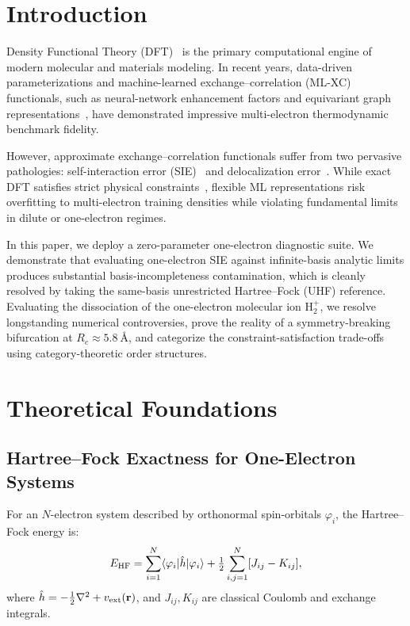\documentclass[conference]{IEEEtran}
\begin{document}
\section{Introduction}
Density Functional Theory (DFT)~\cite{HK1964,KS1965} is the primary computational engine of modern molecular and materials modeling. In recent years, data-driven parameterizations and machine-learned exchange--correlation (ML-XC) functionals, such as neural-network enhancement factors and equivariant graph representations~\cite{CIDER2022,CIDER2026,Skala2025,e3nn}, have demonstrated impressive multi-electron thermodynamic benchmark fidelity. 

However, approximate exchange--correlation functionals suffer from two pervasive pathologies: self-interaction error (SIE)~\cite{PZ1981} and delocalization error~\cite{CMSY2008,CMSY2012}. While exact DFT satisfies strict physical constraints~\cite{LO1981,PPLB1982}, flexible ML representations risk overfitting to multi-electron training densities while violating fundamental limits in dilute or one-electron regimes.

In this paper, we deploy a zero-parameter one-electron diagnostic suite. We demonstrate that evaluating one-electron SIE against infinite-basis analytic limits produces substantial basis-incompleteness contamination, which is cleanly resolved by taking the same-basis unrestricted Hartree--Fock (UHF) reference. Evaluating the dissociation of the one-electron molecular ion $\text{H}_2^+$, we resolve longstanding numerical controversies, prove the reality of a symmetry-breaking bifurcation at $R_c \approx 5.8\ \text{\AA}$, and categorize the constraint-satisfaction trade-offs using category-theoretic order structures.

\section{Theoretical Foundations}
\subsection{Hartree--Fock Exactness for One-Electron Systems}
For an $N$-electron system described by orthonormal spin-orbitals $\varphi_i$, the Hartree--Fock energy is:
\begin{equation}
E_{\rm HF} = \sum_{i=1}^N \langle \varphi_i | \hat h | \varphi_i \rangle + \tfrac12 \sum_{i,j=1}^N [ J_{ij} - K_{ij} ],
\label{eq:hf_gen}
\end{equation}
where $\hat h = -\tfrac12 \nabla^2 + v_{\rm ext}(\mathbf{r})$, and $J_{ij}, K_{ij}$ are classical Coulomb and exchange integrals.
\end{document}
